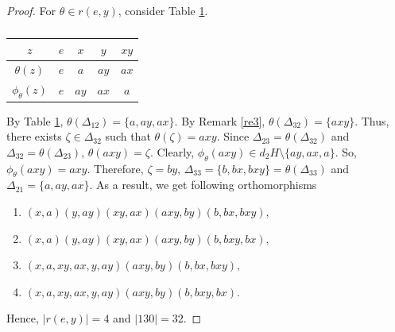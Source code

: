 \documentclass[11pt,a4paper]{article}
\theoremstyle{definition}
\theoremstyle{remark}
\begin{document}
\begin{proof}
		   For $\theta \in r(e,y)$, consider Table \ref{t2}.
		\begin{table}[H]
		\begin{center}
				\begin{tabular}{|c| c| c| c|c|}
				\hline
			$z$ & $e$ & $x$ & $y$ & $xy$ \\ \hline
			$\theta(z)$ & $e$ & $a$ & $ay$ & $ax$\\ \hline
			$\phi_{\theta}(z)$ & $e$ & $ay$ & $ax$ & $a$ \\ \hline
			\end{tabular}\caption{} \label{t2}
		\end{center}
		\end{table}
		\vspace{-.7cm}
		By Table \ref{t2}, $\theta(\Delta_{12}) = \{a,ay,ax\}.$ By Remark \ref{re3}, $\theta(\Delta_{32}) = \{axy\}$. Thus, there exists  $\zeta \in \Delta_{32}$ such that $\theta(\zeta) = axy$. Since $\Delta_{23} = \theta(\Delta_{32})$ and $\Delta_{32} = \theta(\Delta_{23})$, $\theta(axy) = \zeta$. Clearly, $\phi_{\theta}(axy) \in d_{2}H \setminus \{ay,ax,a\}$. So, $\phi_{\theta}(axy) = axy$. Therefore, $\zeta = by                                                                                                                                                                                                                                                                                                                                                                                                                                                                                                                                                                                                                                                                                                                                                                                                                                                                                                                                                                                                                                                                                                                                                                                                                       $, $\Delta_{33} = \{b,bx,bxy\} = \theta(\Delta_{33})$ and $\Delta_{21} =\{a,ay,ax\}$. As a result, we get following orthomorphisms
		\begin{enumerate}
			\item [(i)] $(x,a)(y,ay)(xy,ax)(axy,by)(b,bx,bxy),$ 
			\item [(ii)] $(x,a)(y,ay)(xy,ax)(axy,by)(b,bxy,bx),$ 
			\item [(iii)]$(x,a,xy,ax,y,ay)(axy,by)(b,bx,bxy),$ 
			\item [(iv)]$(x,a,xy,ax,y,ay)(axy,by)(b,bxy,bx).$ 
		\end{enumerate}
		Hence, $|r(e,y)| = 4$ and $|130| = 32$.
	\end{proof}
\end{document}
